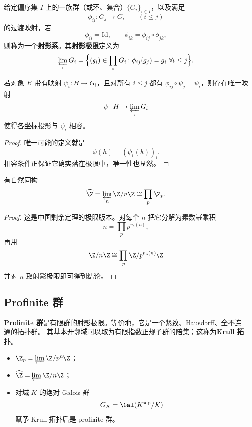 \begin{definition}[射影系与射影极限]
给定偏序集 $I$ 上的一族群（或环、集合）$\{G_i\}_{i\in I}$，以及满足
\[
  \phi_{ij}\colon G_j\to G_i \qquad (i\le j)
\]
的过渡映射，若
\[
  \phi_{ii}=\mathrm{Id},
  \qquad
  \phi_{ik}=\phi_{ij}\circ \phi_{jk},
\]
则称为一个\textbf{射影系}。其\textbf{射影极限}定义为
\begin{equation}
  \varprojlim_i G_i
  =\Bigl\{(g_i)\in \prod_i G_i : \phi_{ij}(g_j)=g_i\ \forall i\le j\Bigr\}.
\end{equation}
\end{definition}

\begin{proposition}[泛性质]
若对象 $H$ 带有映射 $\psi_i\colon H\to G_i$，且对所有 $i\le j$ 都有
$\phi_{ij}\circ \psi_j=\psi_i$，则存在唯一映射
\begin{equation}
  \psi\colon H\to \varprojlim_i G_i
\end{equation}
使得各坐标投影与 $\psi_i$ 相容。
\end{proposition}

\begin{proof}
唯一可能的定义就是
\[
  \psi(h)=(\psi_i(h))_i.
\]
相容条件正保证它确实落在极限中，唯一性也显然。
\end{proof}

\begin{proposition}
有自然同构
\begin{equation}
  \widehat{\Z}=\varprojlim_n \Z/n\Z \cong \prod_p \Z_p.
\end{equation}
\end{proposition}

\begin{proof}
这是中国剩余定理的极限版本。对每个 $n$ 把它分解为素数幂乘积
\[
  n=\prod_p p^{v_p(n)},
\]
再用
\[
  \Z/n\Z\cong \prod_p \Z/p^{v_p(n)}\Z
\]
并对 $n$ 取射影极限即可得到结论。
\end{proof}

\subsection{Profinite 群}

\begin{definition}[profinite 群]
\textbf{Profinite 群}是有限群的射影极限。等价地，它是一个紧致、Hausdorff、全不连通的拓扑群。
其基本开邻域可以取为有限指数正规子群的陪集；这称为\textbf{Krull 拓扑}。
\end{definition}

\begin{example}
\begin{itemize}
  \item $\Z_p=\varprojlim \Z/p^n\Z$；
  \item $\widehat{\Z}=\varprojlim \Z/n\Z$；
  \item 对域 $K$ 的绝对 Galois 群
  \[
    G_K=\Gal(K^{\mathrm{sep}}/K)
  \]
  赋予 Krull 拓扑后是 profinite 群。
\end{itemize}
\end{example}


